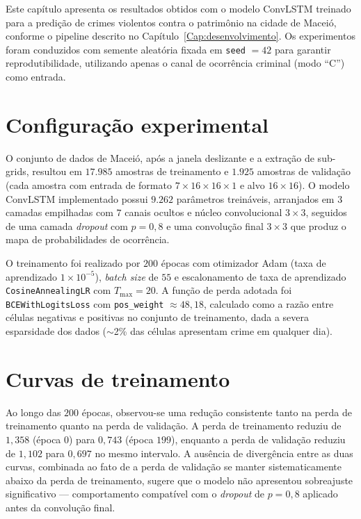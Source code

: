 
\label{cap:resultados}

Este capítulo apresenta os resultados obtidos com o modelo ConvLSTM treinado para a predição de crimes violentos contra o patrimônio na cidade de Maceió, conforme o pipeline descrito no Capítulo~\ref{Cap:desenvolvimento}. Os experimentos foram conduzidos com semente aleatória fixada em \texttt{seed} $= 42$ para garantir reprodutibilidade, utilizando apenas o canal de ocorrência criminal (modo ``C'') como entrada.

\section{Configuração experimental}
\label{Sec:ConfigExperimental}

O conjunto de dados de Maceió, após a janela deslizante e a extração de sub-grids, resultou em $17.985$ amostras de treinamento e $1.925$ amostras de validação (cada amostra com entrada de formato $7 \times 16 \times 16 \times 1$ e alvo $16 \times 16$). O modelo ConvLSTM implementado possui $9.262$ parâmetros treináveis, arranjados em $3$ camadas empilhadas com $7$ canais ocultos e núcleo convolucional $3 \times 3$, seguidos de uma camada \textit{dropout} com $p = 0{,}8$ e uma convolução final $3 \times 3$ que produz o mapa de probabilidades de ocorrência.

O treinamento foi realizado por $200$ épocas com otimizador Adam (taxa de aprendizado $1 \times 10^{-5}$), \textit{batch size} de $55$ e escalonamento de taxa de aprendizado \texttt{CosineAnnealingLR} com $T_{\max} = 20$. A função de perda adotada foi \texttt{BCEWithLogitsLoss} com \texttt{pos\_weight} $\approx 48{,}18$, calculado como a razão entre células negativas e positivas no conjunto de treinamento, dada a severa esparsidade dos dados ($\sim$2\% das células apresentam crime em qualquer dia).

\section{Curvas de treinamento}
\label{Sec:CurvasTreinamento}

Ao longo das $200$ épocas, observou-se uma redução consistente tanto na perda de treinamento quanto na perda de validação. A perda de treinamento reduziu de $1{,}358$ (época $0$) para $0{,}743$ (época $199$), enquanto a perda de validação reduziu de $1{,}102$ para $0{,}697$ no mesmo intervalo. A ausência de divergência entre as duas curvas, combinada ao fato de a perda de validação se manter sistematicamente abaixo da perda de treinamento, sugere que o modelo não apresentou sobreajuste significativo --- comportamento compatível com o \textit{dropout} de $p = 0{,}8$ aplicado antes da convolução final.

